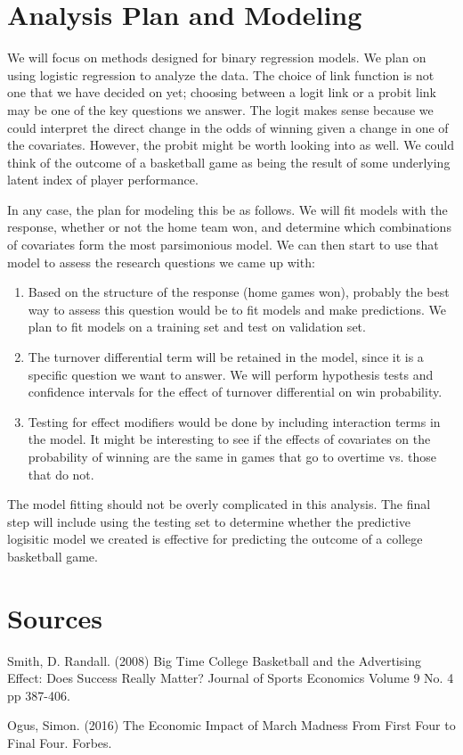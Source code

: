 \documentclass[12pt]{article}\usepackage[]{graphicx}\usepackage[]{color}
\begin{document}
\section{Analysis Plan and Modeling}

We will focus on methods designed for binary regression models. We plan on using logistic regression to analyze the data. The choice of link function is not one that we have decided on yet; choosing between a logit link or a probit link may be one of the key questions we answer. The logit makes sense because we could interpret the direct change in the odds of winning given a change in one of the covariates. However, the probit might be worth looking into as well. We could think of the outcome of a basketball game as being the result of some underlying latent index of player performance. 

In any case, the plan for modeling this be as follows. We will fit models with the response, whether or not the home team won, and determine which combinations of covariates form the most parsimonious model. We can then start to use that model to assess the research questions we came up with:

\begin{enumerate}
\item %
Based on the structure of the response (home games won), probably the best way to assess this question would be to fit models and make predictions. We plan to fit models on a training set and test on validation set. 

\item %
The turnover differential term will be retained in the model, since it is a specific question we want to answer. We will perform hypothesis tests and confidence intervals for the effect of turnover differential on win probability.
\item %
Testing for effect modifiers would be done by including interaction terms in the model. It might be interesting to see if the effects of covariates on the probability of winning are the same in games that go to overtime vs. those that do not.  

\end{enumerate}

The model fitting should not be overly complicated in this analysis. The final step will include using the testing set to determine whether the predictive logisitic model we created is effective for predicting the outcome of a college basketball game. 

\section{Sources}
Smith, D. Randall. (2008) Big Time College Basketball and the Advertising Effect: Does Success Really Matter? Journal of Sports Economics Volume 9 No. 4 pp 387-406.

Ogus, Simon. (2016) The Economic Impact of March Madness From First Four to Final Four. Forbes. 
\end{document}
